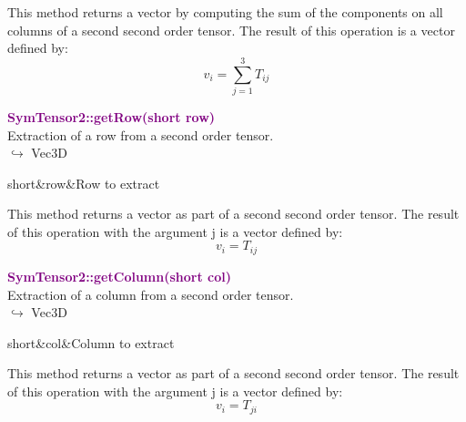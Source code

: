 This method returns a vector by computing the sum of the components on all columns of a second second order tensor.
The result of this operation is a vector defined by:
\begin{equation*}
v_{i}=\sum_{j=1}^{3}T_{ij}
\end{equation*}

\textcolor{purple}{\textbf{SymTensor2::getRow(short row)}}\label{SymTensor2::getRow(short row)}\\
Extraction of a row from a second order tensor.\\ \hspace*{10mm}$\hookrightarrow$ Vec3D

\begin{tcolorbox}[width=\textwidth,myArgs,tabularx={ll|R}]
short&row&Row to extract
\end{tcolorbox}

This method returns a vector as part of a second second order tensor.
The result of this operation with the argument j is a vector defined by:
\begin{equation*}
v_{i} = T_{ij}
\end{equation*}

\textcolor{purple}{\textbf{SymTensor2::getColumn(short col)}}\label{SymTensor2::getColumn(short col)}\\
Extraction of a column from a second order tensor.\\ \hspace*{10mm}$\hookrightarrow$ Vec3D

\begin{tcolorbox}[width=\textwidth,myArgs,tabularx={ll|R}]
short&col&Column to extract
\end{tcolorbox}

This method returns a vector as part of a second second order tensor.
The result of this operation with the argument j is a vector defined by:
\begin{equation*}
v_{i} = T_{ji}
\end{equation*}

